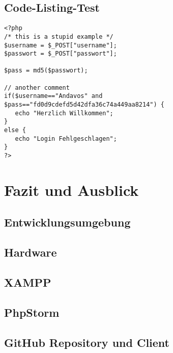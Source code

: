 \documentclass[12pt,a4paper,titlepage]{article} %
\begin{document}
\subsection{Code-Listing-Test}
\begin{lstlisting}
<?php
/* this is a stupid example */
$username = $_POST["username"];
$passwort = $_POST["passwort"];

$pass = md5($passwort);

// another comment
if($username=="Andavos" and
$pass=="fd0d9cdefd5d42dfa36c74a449aa8214") {
   echo "Herzlich Willkommen";
}
else {
   echo "Login Fehlgeschlagen";
}
?>
\end{lstlisting}

\clearpage
\newpage

\section{Fazit und Ausblick} %



\clearpage
\newpage
\begin{appendix}


\section{Entwicklungsumgebung}
\subsection{Hardware}
\subsection{XAMPP}
\subsection{PhpStorm}
\subsection{GitHub Repository und Client}
\end{appendix}
\end{document}
